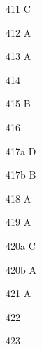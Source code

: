 \begin{Solution}{411}
C
\end{Solution}
\begin{Solution}{412}
A
\end{Solution}
\begin{Solution}{413}
A
\end{Solution}
\begin{Solution}[\nameex ]{414}
\end{Solution}
\begin{Solution}{415}
B
\end{Solution}
\begin{Solution}[\nameex ]{416}
\end{Solution}
\begin{Solution}{417a}
D
\end{Solution}
\begin{Solution}{417b}
B
\end{Solution}
\begin{Solution}{418}
A
\end{Solution}
\begin{Solution}{419}
A
\end{Solution}
\begin{Solution}{420a}
C
\end{Solution}
\begin{Solution}{420b}
A
\end{Solution}
\begin{Solution}{421}
A
\end{Solution}
\begin{Solution}[\nameex ]{422}
\end{Solution}
\begin{Solution}[\nameex ]{423}
\end{Solution}
